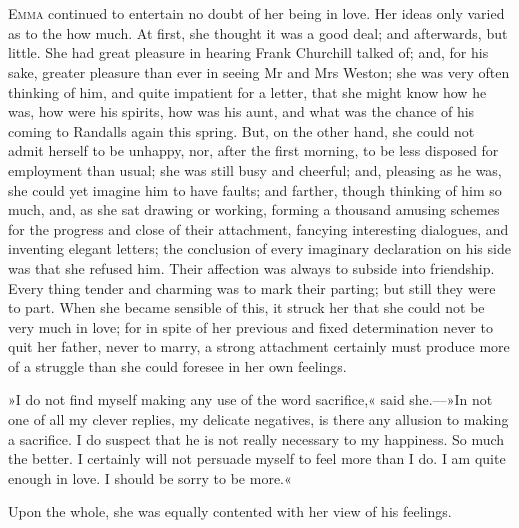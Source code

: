\chapter[Chapter \thechapter]{}
\lettrine[lines=4,lraise=0.3]{E}{mma} continued to entertain no doubt of her being in love. Her ideas only varied as to the how much. At first, she thought it was a good deal; and afterwards, but little. She had great pleasure in hearing Frank Churchill talked of; and, for his sake, greater pleasure than ever in seeing Mr and Mrs Weston; she was very often thinking of him, and quite impatient for a letter, that she might know how he was, how were his spirits, how was his aunt, and what was the chance of his coming to Randalls again this spring. But, on the other hand, she could not admit herself to be unhappy, nor, after the first morning, to be less disposed for employment than usual; she was still busy and cheerful; and, pleasing as he was, she could yet imagine him to have faults; and farther, though thinking of him so much, and, as she sat drawing or working, forming a thousand amusing schemes for the progress and close of their attachment, fancying interesting dialogues, and inventing elegant letters; the conclusion of every imaginary declaration on his side was that she refused him. Their affection was always to subside into friendship. Every thing tender and charming was to mark their parting; but still they were to part. When she became sensible of this, it struck her that she could not be very much in love; for in spite of her previous and fixed determination never to quit her father, never to marry, a strong attachment certainly must produce more of a struggle than she could foresee in her own feelings.

»I do not find myself making any use of the word sacrifice,« said she.—»In not one of all my clever replies, my delicate negatives, is there any allusion to making a sacrifice. I do suspect that he is not really necessary to my happiness. So much the better. I certainly will not persuade myself to feel more than I do. I am quite enough in love. I should be sorry to be more.«

Upon the whole, she was equally contented with her view of his feelings.

